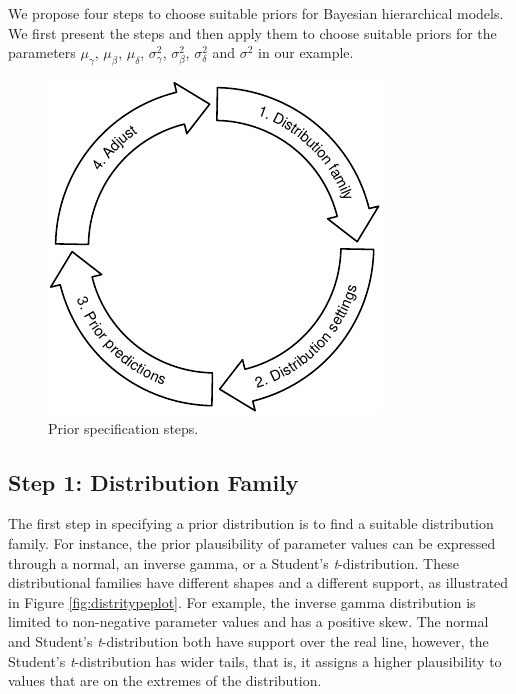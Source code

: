 \documentclass[
  english,
  doc,floatsintext]{apa6}
\begin{document}
We propose four steps to choose suitable priors for Bayesian hierarchical models. We first present the steps and then apply them to choose suitable priors for the parameters \(\mu_{\gamma}\), \(\mu_{\beta}\), \(\mu_{\delta}\), \(\sigma_{\gamma}^2\), \(\sigma_{\beta}^2\), \(\sigma_{\delta}^2\) and \(\sigma^2\) in our example.

\begin{figure}[H]

{\centering \includegraphics{manuscript_files/figure-latex/distributionsteps-1} 

}

\caption{Prior specification steps.}\label{fig:distributionsteps}
\end{figure}

\hypertarget{step-1-distribution-family}{%
\subsection{Step 1: Distribution Family}\label{step-1-distribution-family}}

The first step in specifying a prior distribution is to find a suitable distribution family. For instance, the prior plausibility of parameter values can be expressed through a normal, an inverse gamma, or a Student's \emph{t}-distribution. These distributional families have different shapes and a different support, as illustrated in Figure \ref{fig:distritypeplot}. For example, the inverse gamma distribution is limited to non-negative parameter values and has a positive skew. The normal and Student's \emph{t}-distribution both have support over the real line, however, the Student's \emph{t}-distribution has wider tails, that is, it assigns a higher plausibility to values that are on the extremes of the distribution.
\end{document}
